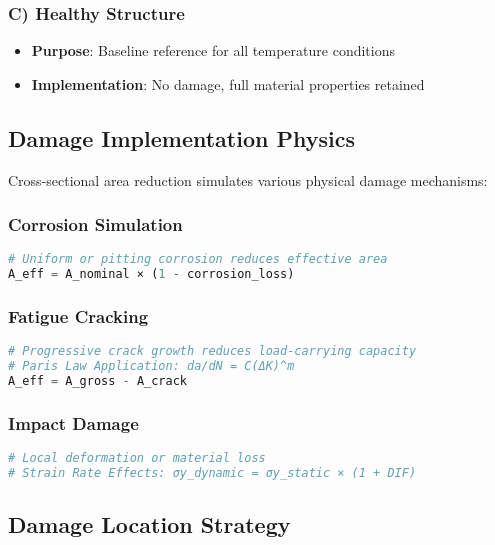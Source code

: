 \documentclass[12pt,a4paper]{article}
\begin{document}
\subsubsection{C) Healthy Structure}
\begin{itemize}
    \item \textbf{Purpose}: Baseline reference for all temperature conditions
    \item \textbf{Implementation}: No damage, full material properties retained
\end{itemize}

\subsection{Damage Implementation Physics}

Cross-sectional area reduction simulates various physical damage mechanisms:

\subsubsection{Corrosion Simulation}
\begin{lstlisting}[language=Python, caption=Corrosion Damage Implementation]
# Uniform or pitting corrosion reduces effective area
A_eff = A_nominal × (1 - corrosion_loss)
\end{lstlisting}

\subsubsection{Fatigue Cracking}
\begin{lstlisting}[language=Python, caption=Fatigue Damage Implementation]
# Progressive crack growth reduces load-carrying capacity
# Paris Law Application: da/dN = C(ΔK)^m
A_eff = A_gross - A_crack
\end{lstlisting}

\subsubsection{Impact Damage}
\begin{lstlisting}[language=Python, caption=Impact Damage Implementation]
# Local deformation or material loss
# Strain Rate Effects: σy_dynamic = σy_static × (1 + DIF)
\end{lstlisting}

\subsection{Damage Location Strategy}
\end{document}
